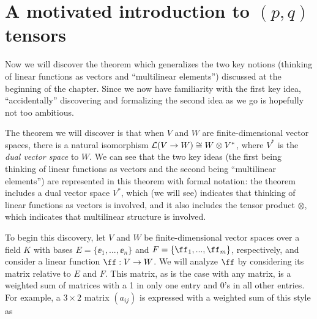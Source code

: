 \newpage

\section{A motivated introduction to $(p, q)$ tensors}
\label{ch::motivated_intro::sec::motivated_intro}

Now we will discover the theorem which generalizes the two key notions (thinking of linear functions as vectors and ``multilinear elements'') discussed at the beginning of the chapter. Since we now have familiarity with the first key idea, ``accidentally'' discovering and formalizing the second idea as we go is hopefully not too ambitious.

The theorem we will discover is that when $V$ and $W$ are finite-dimensional vector spaces, there is a natural isomorphism $\mathcal{L}(V \rightarrow W) \cong W \otimes V^*$, where $V^*$ is the \textit{dual vector space} to $W$. We can see that the two key ideas (the first being thinking of linear functions as vectors and the second being ``multilinear elements'') are represented in this theorem with formal notation: the theorem includes a dual vector space $V^*$, which (we will see) indicates that thinking of linear functions as vectors is involved, and it also includes the tensor product $\otimes$, which indicates that multilinear structure is involved.

To begin this discovery, let $V$ and $W$ be finite-dimensional vector spaces over a field $K$ with bases $E = \{\ee_1, ..., \ee_n\}$ and $F = \{\ff_1, ..., \ff_m\}$, respectively, and consider a linear function $\ff:V \rightarrow W$. We will analyze $\ff$ by considering its matrix relative to $E$ and $F$. This matrix, as is the case with any matrix, is a weighted sum of matrices with a 1 in only one entry and 0's in all other entries. For example, a $3 \times 2$ matrix $(a_{ij})$ is expressed with a weighted sum of this style as

